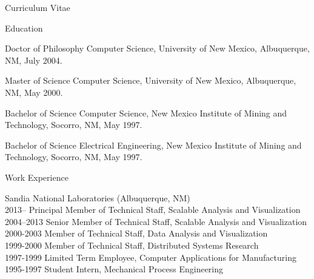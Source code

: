 \documentclass{article}
\begin{document}
  \begin{cv}{Curriculum Vitae}
    \setlength{\cvlabelwidth}{.25in}
    \renewcommand*{\cvlabelfont}{\textsf}

    \begin{cvlist}{Education}
      \item[Doctor of Philosophy] Computer Science, University of New
        Mexico, Albuquerque, NM, July 2004.
      \item[Master of Science] Computer Science, University of New Mexico,
        Albuquerque, NM, May 2000.
      \item[Bachelor of Science] Computer Science, New Mexico Institute of
        Mining and Technology, Socorro, NM, May 1997.
      \item[Bachelor of Science] Electrical Engineering, New Mexico
        Institute of Mining and Technology, Socorro, NM, May 1997.
    \end{cvlist}

    \begin{cvlist}{Work Experience}
    \item[Sandia National Laboratories (Albuquerque, NM)]\hfill\\
      2013-- Principal Member of Technical Staff, Scalable Analysis and Visualization\\
      2004--2013 Senior Member of Technical Staff, Scalable Analysis and Visualization\\
      2000-2003 Member of Technical Staff, Data Analysis and Visualization\\
      1999-2000 Member of Technical Staff, Distributed Systems Research\\
      1997-1999 Limited Term Employee, Computer Applications for Manufacturing\\
      1995-1997 Student Intern, Mechanical Process Engineering\\
    \end{cvlist}



\end{cv}
\end{document}
